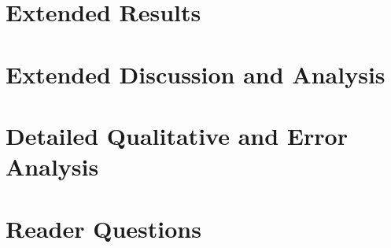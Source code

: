 \section{Extended Results}\label{app:extended-results}

\section{Extended Discussion and Analysis}\label{app:discussion}

\section{Detailed Qualitative and Error Analysis}\label{app:qualitative}

\section{Reader Questions}\label{app:faq}
